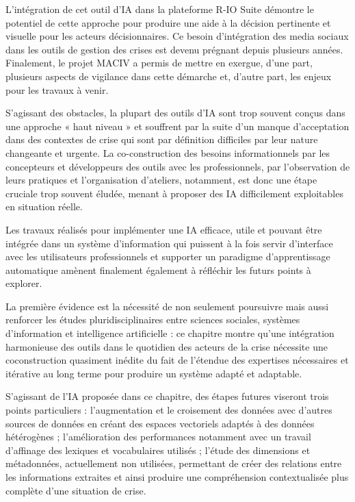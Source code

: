 L'intégration de cet outil d'IA dans la plateforme R-IO Suite démontre le potentiel
de cette approche pour produire une aide à la décision pertinente et visuelle pour
les acteurs décisionnaires. Ce besoin d'intégration des media sociaux dans les outils
de gestion des crises est devenu prégnant depuis plusieurs années. Finalement, le
projet MACIV a permis de mettre en exergue, d'une part, plusieurs aspects de
vigilance dans cette démarche et, d'autre part, les enjeux pour les travaux à venir.

S'agissant des obstacles, la plupart des outils d'IA sont trop souvent conçus dans une
approche « haut niveau » et souffrent par la suite d'un manque d'acceptation dans
des contextes de crise qui sont par définition difficiles par leur nature changeante
et urgente. La co-construction des besoins informationnels par les concepteurs et
développeurs des outils avec les professionnels, par l'observation de leurs pratiques
et l'organisation d'ateliers, notamment, est donc une étape cruciale trop souvent
éludée, menant à proposer des IA difficilement exploitables en situation réelle.

Les travaux réalisés pour implémenter une IA efficace, utile et pouvant être intégrée
dans un système d'information qui puissent à la fois servir d'interface avec les
utilisateurs professionnels et supporter un paradigme d'apprentissage automatique
amènent finalement également à réfléchir les futurs points à explorer.

La première évidence est la nécessité de non seulement poursuivre mais
aussi renforcer les études pluridisciplinaires entre sciences sociales, systèmes
d'information et intelligence artificielle : ce chapitre montre qu'une intégration
harmonieuse des outils dans le quotidien des acteurs de la crise nécessite une coconstruction
quasiment inédite du fait de l'étendue des expertises nécessaires et
itérative au long terme pour produire un système adapté et adaptable.

S'agissant de l'IA proposée dans ce chapitre, des étapes futures viseront trois points
particuliers : l'augmentation et le croisement des données avec d'autres sources
de données en créant des espaces vectoriels adaptés à des données hétérogènes ;
l'amélioration des performances notamment avec un travail d'affinage des lexiques
et vocabulaires utilisés ; l'étude des dimensions et métadonnées, actuellement non
utilisées, permettant de créer des relations entre les informations extraites et ainsi
produire une compréhension contextualisée plus complète d'une situation de crise.

